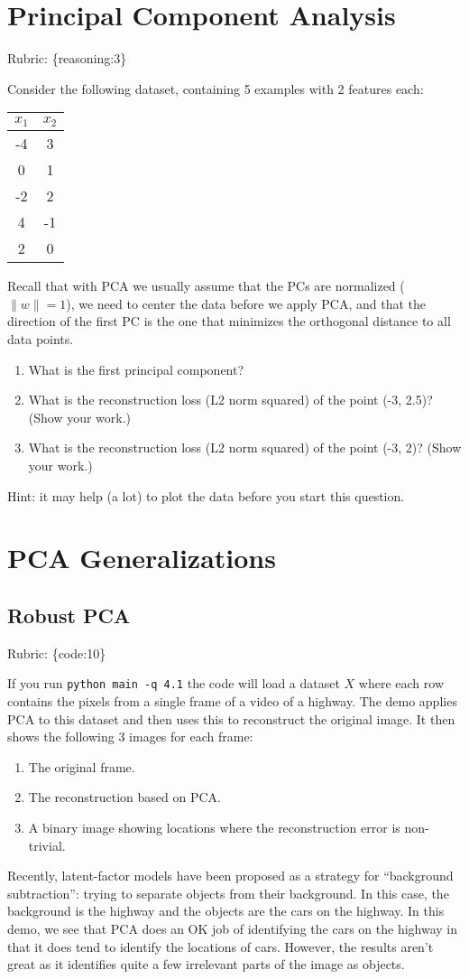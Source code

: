 \documentclass{article}
\def\rubric#1{\gre{Rubric: \{#1\}}}{}
\def\blu#1{{\color{blu}#1}}
\def\gre#1{{\color{gre}#1}}
\def\norm#1{\|#1\|}
\def\ans#1{{\color{ans}#1}}
\def\enum#1{\begin{enumerate}#1\end{enumerate}}
\begin{document}
\section{Principal Component Analysis}
\rubric{reasoning:3}


Consider the following dataset, containing 5 examples with 2 features each:
\begin{center}
\begin{tabular}{cc}
$x_1$ & $x_2$\\
\hline
-4 & 3\\
0 & 1\\
-2 & 2\\
4 & -1\\
2 & 0\\
\end{tabular}
\end{center}
Recall that with PCA we usually assume that the PCs are normalized ($\norm{w} = 1$), we need to center the data before we apply PCA, and that the direction of the first PC is the one that minimizes the orthogonal distance to all data points.
\blu{
\enum{
\item What is the first principal component?
\ans{
}
\item What is the reconstruction loss (L2 norm squared) of the point (-3, 2.5)? (Show your work.)
\ans{
}
\item What is the reconstruction loss (L2 norm squared) of the point (-3, 2)? (Show your work.)
\ans{
}
}
}
Hint: it may help (a lot) to plot the data before you start this question.



\section{PCA Generalizations}

\subsection{Robust PCA}
\rubric{code:10}

If you run \verb|python main -q 4.1| the code will load a dataset $X$ where each row contains the pixels from a single frame of a video of a highway. The demo applies PCA to this dataset and then uses this to reconstruct the original image.
It then shows the following 3 images for each frame:
\enum{
\item The original frame.
\item The reconstruction based on PCA.
\item A binary image showing locations where the reconstruction error is non-trivial.
}
Recently, latent-factor models have been proposed as a strategy for ``background subtraction'': trying to separate objects from their background. In this case, the background is the highway and the objects are the cars on the highway. In this demo, we see that PCA does an OK job of identifying the cars on the highway in that it does tend to identify the locations of cars. However, the results aren't great as it identifies quite a few irrelevant parts of the image as objects.
\end{document}
